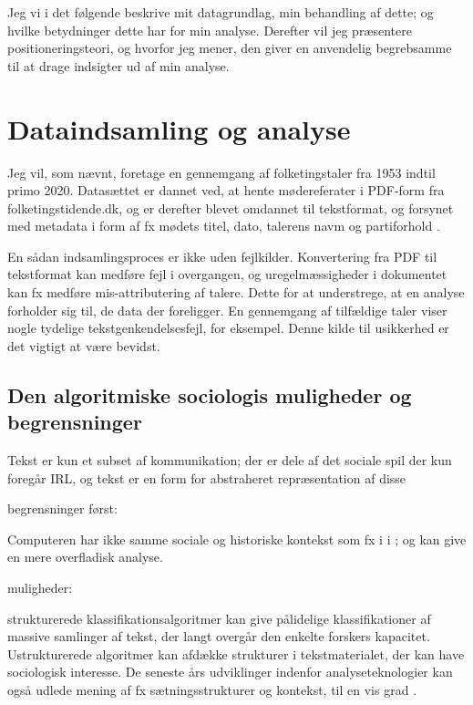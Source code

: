  Jeg vi i det følgende beskrive mit datagrundlag, min behandling af dette; og hvilke betydninger dette har for min analyse.
Derefter vil jeg præsentere positioneringsteori, og hvorfor jeg mener, den giver en anvendelig begrebsamme til at drage indsigter ud af min analyse.

\chapter{Dataindsamling og analyse}\label{chap:data}

Jeg vil, som nævnt, foretage en gennemgang af folketingstaler fra 1953 indtil primo 2020.
Datasættet er dannet ved, at hente mødereferater i PDF-form fra folketingstidende.dk, og er derefter blevet omdannet til tekstformat, og forsynet med metadata i form af fx mødets titel, dato, talerens navm og partiforhold  \autocite{pedersenFolketinget2019}.

En sådan indsamlingsproces er ikke uden fejlkilder. Konvertering fra PDF til tekstformat kan medføre fejl i overgangen, og uregelmæssigheder i dokumentet kan fx medføre mis-attributering af talere.
Dette for at understrege, at en analyse forholder sig til, de data der foreligger.
En gennemgang af tilfældige taler viser nogle tydelige tekstgenkendelsesfejl, for eksempel.
Denne kilde til usikkerhed er det vigtigt at være bevidst.

\section{Den algoritmiske sociologis muligheder og begrensninger}

Tekst er kun et subset af kommunikation; der er dele af det sociale spil der kun foregår IRL, og tekst er en form for abstraheret repræsentation af disse \autocite[s. 22]{evansMachineTranslationMining2016}

begrensninger først:

Computeren har ikke samme sociale og historiske kontekst som fx i \citeauthor{juulDiskurserOmUngdom2013} i ; og kan give en mere overfladisk analyse.

muligheder:

strukturerede klassifikationsalgoritmer kan give pålidelige klassifikationer af massive samlinger af tekst, der langt overgår den enkelte forskers kapacitet.
Ustrukturerede algoritmer kan afdække strukturer i tekstmaterialet, der kan have sociologisk interesse.
De seneste års udviklinger indenfor analyseteknologier kan også udlede mening af fx sætningsstrukturer og kontekst, til en vis grad \autocite[s. 22]{evansMachineTranslationMining2016}.

